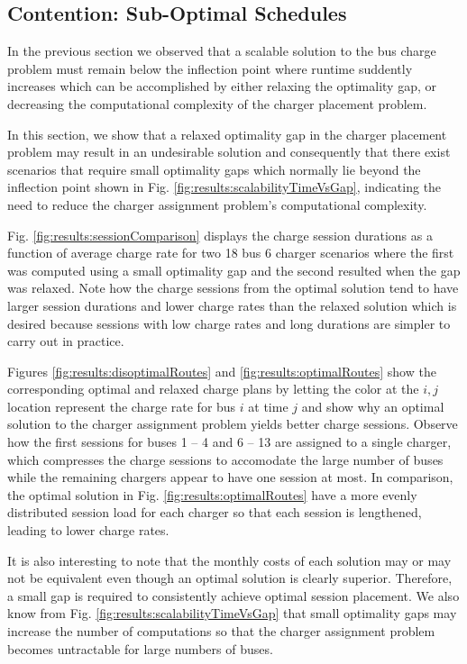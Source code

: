 \subsection{Contention: Sub-Optimal Schedules}
In the previous section we observed that a scalable solution to the bus charge problem must remain below the inflection point where runtime suddently increases which can be accomplished by either relaxing the optimality gap, or decreasing the computational complexity of the charger placement problem.
\par In this section, we show that a relaxed optimality gap in the charger placement problem may result in an undesirable solution and consequently that there exist scenarios that require small optimality gaps which normally lie beyond the inflection point shown in Fig. \ref{fig:results:scalabilityTimeVsGap}, indicating the need to reduce the charger assignment problem's computational complexity. 
\par Fig. \ref{fig:results:sessionComparison} displays the charge session durations as a function of average charge rate for two 18 bus 6 charger scenarios where the first was computed using a small optimality gap and the second resulted when the gap was relaxed. Note how the charge sessions from the optimal solution tend to have larger session durations and lower charge rates than the relaxed solution which is desired because sessions with low charge rates and long durations are simpler to carry out in practice. 
\par Figures \ref{fig:results:disoptimalRoutes} and \ref{fig:results:optimalRoutes} show the corresponding optimal and relaxed charge plans by letting the color at the $i,j$ location represent the charge rate for bus $i$ at time $j$ and show why an optimal solution to the charger assignment problem yields better charge sessions. Observe how the first sessions for buses 1 -- 4 and 6 -- 13 are assigned to a single charger, which compresses the charge sessions to accomodate the large number of buses while the remaining chargers appear to have one session at most. In comparison, the optimal solution in Fig. \ref{fig:results:optimalRoutes} have a more evenly distributed session load for each charger so that each session is lengthened, leading to lower charge rates. 
\par It is also interesting to note that the monthly costs of each solution may or may not be equivalent even though an optimal solution is clearly superior. Therefore, a small gap is required to consistently achieve optimal session placement. We also know from Fig. \ref{fig:results:scalabilityTimeVsGap} that small optimality gaps may increase the number of computations so that the charger assignment problem becomes untractable for large numbers of buses.  

 

